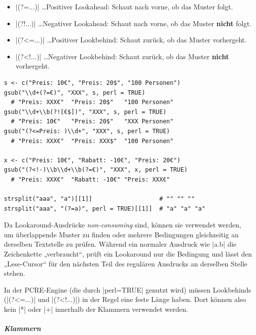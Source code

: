 \documentclass[10pt,twocolumn]{scrartcl}
\renewcommand{\lstinline}{\mycoloredinline}
\begin{document}
\begin{itemize}
\item \lstinline|(?=...)| \dots Positiver Lookahead: Schaut nach vorne, ob das Muster folgt.
\item \lstinline|(?!...)| \dots Negativer Lookahead: Schaut nach vorne, ob das Muster \textbf{nicht} folgt.
\item \lstinline|(?<=...)| \dots Positiver Lookbehind: Schaut zurück, ob das Muster vorhergeht.
\item \lstinline|(?<!...)| \dots Negativer Lookbehind: Schaut zurück, ob das Muster \textbf{nicht} vorhergeht.
\end{itemize}

\begin{lstlisting}
s <- c("Preis: 10€", "Preis: 20$", "100 Personen")
gsub("\\d+(?=€)", "XXX", s, perl = TRUE)
  # "Preis: XXX€"  "Preis: 20$"   "100 Personen"
gsub("\\d+\\b(?![€$])", "XXX", s, perl = TRUE)
  # "Preis: 10€"   "Preis: 20$"   "XXX Personen"
gsub("(?<=Preis: )\\d+", "XXX", s, perl = TRUE)
  # "Preis: XXX€"  "Preis: XXX$"  "100 Personen"

x <- c("Preis: 10€", "Rabatt: -10€", "Preis: 20€")
gsub("(?<!-)\\b\\d+\\b(?=€)", "XXX", x, perl = TRUE)
  # "Preis: XXX€"  "Rabatt: -10€" "Preis: XXX€"

strsplit("aaa", "a")[[1]]                   # "" "" ""
strsplit("aaa", "(?=a)", perl = TRUE)[[1]]  # "a" "a" "a"
\end{lstlisting}

Da Lookaround-Ausdrücke \emph{non-consuming} sind, können sie verwendet werden, um überlappende Muster zu finden oder mehrere Bedingungen gleichzeitig an derselben Textstelle zu prüfen. Während ein normaler Ausdruck wie \lstinline|a.b| die Zeichenkette „verbraucht“, prüft ein Lookaround nur die Bedingung und lässt den „Lese-Cursor“ für den nächsten Teil des regulären Ausdrucks an derselben Stelle stehen.

In der PCRE-Engine (die durch \lstinline|perl=TRUE| genutzt wird) müssen Lookbehinds (\lstinline|(?<=...)| und \lstinline|(?<!...)|) in der Regel eine feste Länge haben. Dort können also kein \lstinline|*| oder \lstinline|+| innerhalb der Klammern verwendet werden.

\subparagraph{Klammern}
\end{document}
